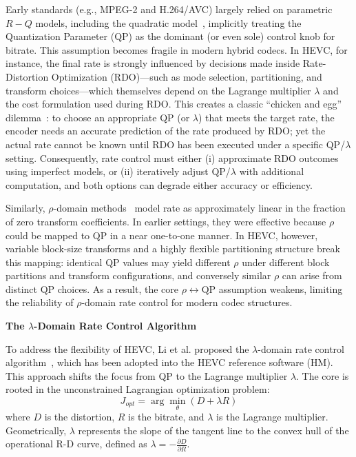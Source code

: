 Early standards (e.g., MPEG-2 and H.264/AVC) largely relied on parametric $R\!-\!Q$ models, including the quadratic model~\cite{math_16}, implicitly treating the Quantization Parameter (QP) as the dominant (or even sole) control knob for bitrate. This assumption becomes fragile in modern hybrid codecs. In HEVC, for instance, the final rate is strongly influenced by decisions made inside Rate-Distortion Optimization (RDO)—such as mode selection, partitioning, and transform choices—which themselves depend on the Lagrange multiplier $\lambda$ and the cost formulation used during RDO. This creates a classic ``chicken and egg'' dilemma~\cite{math_17}: to choose an appropriate QP (or $\lambda$) that meets the target rate, the encoder needs an accurate prediction of the rate produced by RDO; yet the actual rate cannot be known until RDO has been executed under a specific QP/$\lambda$ setting. Consequently, rate control must either (i) approximate RDO outcomes using imperfect models, or (ii) iteratively adjust QP/$\lambda$ with additional computation, and both options can degrade either accuracy or efficiency.

Similarly, $\rho$-domain methods~\cite{math_10} model rate as approximately linear in the fraction of zero transform coefficients. In earlier settings, they were effective because $\rho$ could be mapped to QP in a near one-to-one manner. In HEVC, however, variable block-size transforms and a highly flexible partitioning structure break this mapping: identical QP values may yield different $\rho$ under different block partitions and transform configurations, and conversely similar $\rho$ can arise from distinct QP choices. As a result, the core $\rho \leftrightarrow \text{QP}$ assumption weakens, limiting the reliability of $\rho$-domain rate control for modern codec structures.


\noindent \textbf{The \boldmath$\lambda$-Domain Rate Control Algorithm}

To address the flexibility of HEVC, Li et al. proposed the $\lambda$-domain rate control algorithm~\cite{50}, which has been adopted into the HEVC reference software (HM). This approach shifts the focus from QP to the Lagrange multiplier $\lambda$. The core is rooted in the unconstrained Lagrangian optimization problem:
\begin{equation}
    J_{opt} = \arg \min_{\theta} (D + \lambda R)
\end{equation}
where $D$ is the distortion, $R$ is the bitrate, and $\lambda$ is the Lagrange multiplier. Geometrically, $\lambda$ represents the slope of the tangent line to the convex hull of the operational R-D curve, defined as $\lambda = -\frac{\partial D}{\partial R}$.

